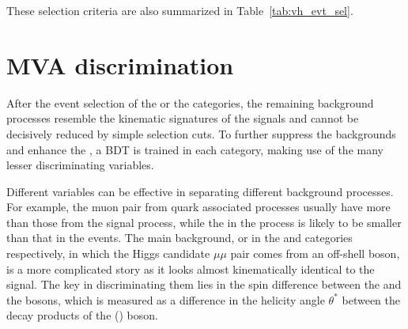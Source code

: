 These selection criteria are also summarized in Table~\ref{tab:vh_evt_sel}.
\begin{table}[!htb]
    \centering
    \captionsetup{justification=centering}
    \label{tab:vh_evt_sel}
\end{table}



\section{MVA discrimination}\label{sec:vh_bdt_cats}

After the event selection of the \WH or the \ZH categories, the remaining background processes 
resemble the kinematic signatures of the signals and cannot be decisively reduced by simple selection cuts.
To further suppress the backgrounds and enhance the \SoB, a BDT is trained in each category, 
making use of the many lesser discriminating variables.

Different variables can be effective in separating different background processes.
For example, the muon pair from \Pqt quark associated processes usually have more \pt than those from the \WH signal process,
while the \MET in the \DY process is likely to be smaller than that in the \WH events.
The main background, \WZ or \ZZ in the \WH and \ZH categories respectively, 
in which the Higgs candidate $\mu\mu$ pair comes from an off-shell \PZ boson,
is a more complicated story as it looks almost kinematically identical to the signal.  
The key in discriminating them lies in the spin difference between the \PZ and the \PH bosons,
which is measured as a difference in the helicity angle $\theta^{*}$ between the decay products of the \PZ (\PH) boson.

